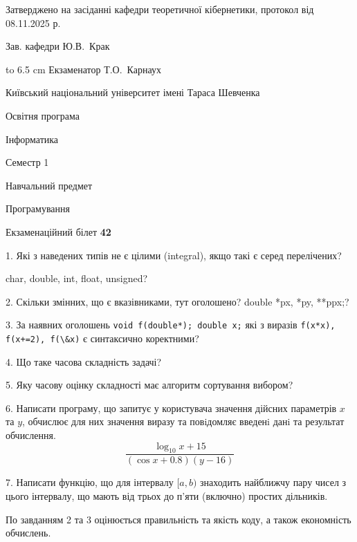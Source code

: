 \documentclass[12pt, ukrainian]{article}
\def\code#1{\Verb!#1!}
\begin{document}
{\smallskip\smallskip \begin {scriptsize} Затверджено на засіданні кафедри теоретичної кібернетики, протокол   від   08.11.2025 р.\par\smallskip\smallskip\smallskip\smallskip
{\parbox {6.5 cm} {Зав. кафедри \dotfill Ю.В.~Крак}}\hspace {0.7cm} {\hbox to 6.5 cm { Екзаменатор \dotfill Т.О.~Карнаух}} \end{scriptsize}}
\vspace{0.9cm}
{{\begin {scriptsize}\par
{ \center  Київський національний університет імені Тараса Шевченка \par}
{\parbox {5 cm}{Освітня програма \hfill}{\parbox {7 cm}{Інформатика\hfill}}\parbox {6 cm}{\hfill Семестр 1}}\par
{\parbox {5 cm} {Навчальний предмет \hfill}\parbox {7 cm}{Програмування \hfill}\parbox {6cm}{\hfill}\par}\vspace{-15pt} \end{scriptsize}}{\center Екзаменаційний білет \No \textbf { 42 }\par}}
{%
1. Які з наведених типів не є цілими (integral), якщо такі є серед перелічених?

char, double, int, float, unsigned?
\par
\vspace{2mm}
2. Скільки змінних, що є вказівниками, тут оголошено?
double *px, *py, **ppx;?
\par
\vspace{2mm}
3. За наявних оголошень \code{void f(double*); double x;} які з виразів \code{f(x*x), f(x+=2), f(\&x)} є синтаксично коректними?
\par
\vspace{2mm}
4. Що таке часова складність задачі?
\par
\vspace{2mm}
5. Яку часову оцінку складності має алгоритм сортування вибором?
\par
\vspace{2mm}
6. Написати програму, що запитує у користувача значення дійсних параметрів $x$ та $y$, обчислює для них значення виразу та повiдомляє введенi данi та результат обчислення.
$$\frac{\log_{10} x + 15}{(\cos x + 0.8) (y - 16)}$$ 

\par
7. Написати функцію, що для інтервалу $[a, b)$ знаходить найближчу пару чисел з цього інтервалу, що мають від трьох до п'яти (включно) простих дільників.

По завданням 2 та 3 оцінюється правильність та якість коду, а також економність обчислень.

}
\end{document}
